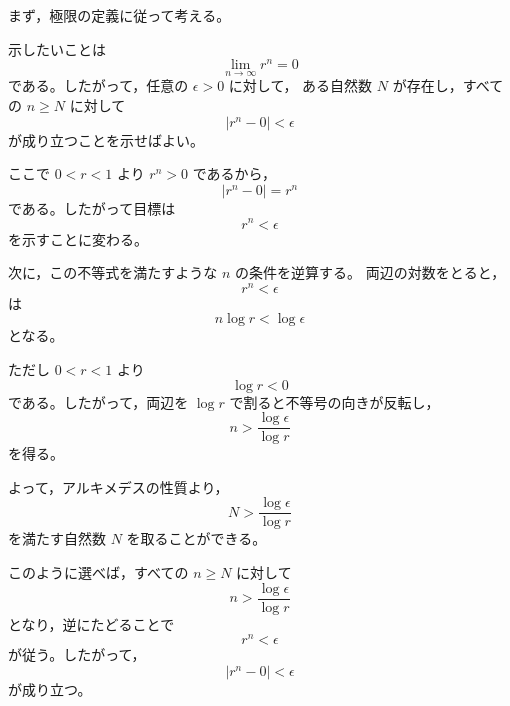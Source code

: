 \begin{strategy}
	まず，極限の定義に従って考える。
	
	示したいことは
	\[
	\lim_{n\to\infty}r^n=0
	\]
	である。したがって，任意の $\epsilon>0$ に対して，
	ある自然数 $N$ が存在し，すべての $n\geq N$ に対して
	\[
	|r^n-0|<\epsilon
	\]
	が成り立つことを示せばよい。
	
	ここで $0<r<1$ より $r^n>0$ であるから，
	\[
	|r^n-0|=r^n
	\]
	である。したがって目標は
	\[
	r^n<\epsilon
	\]
	を示すことに変わる。
	
	次に，この不等式を満たすような $n$ の条件を逆算する。
	両辺の対数をとると，
	\[
	r^n<\epsilon
	\]
	は
	\[
	n\log r<\log\epsilon
	\]
	となる。
	
	ただし $0<r<1$ より
	\[
	\log r<0
	\]
	である。したがって，両辺を $\log r$ で割ると不等号の向きが反転し，
	\[
	n>\frac{\log\epsilon}{\log r}
	\]
	を得る。
	
	よって，アルキメデスの性質より，
	\[
	N>\frac{\log\epsilon}{\log r}
	\]
	を満たす自然数 $N$ を取ることができる。
	
	このように選べば，すべての $n\geq N$ に対して
	\[
	n>\frac{\log\epsilon}{\log r}
	\]
	となり，逆にたどることで
	\[
	r^n<\epsilon
	\]
	が従う。したがって，
	\[
	|r^n-0|<\epsilon
	\]
	が成り立つ。
\end{strategy}
